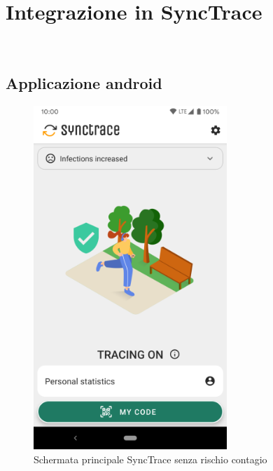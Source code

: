 
\chapter{Integrazione in SyncTrace}
\label{cap:integrazione-synctrace}
\\

\section{Applicazione android}
\begin{figure}[!htb]
   \begin{minipage}{0.48\textwidth}
     \centering
     \includegraphics[width=0.65\textwidth]{./immagini/appnormal}
     \caption{Schermata principale SyncTrace senza rischio contagio}
   \end{minipage}\hfill
   \begin{minipage}{0.48\textwidth}

\end{minipage}
\end{figure}
